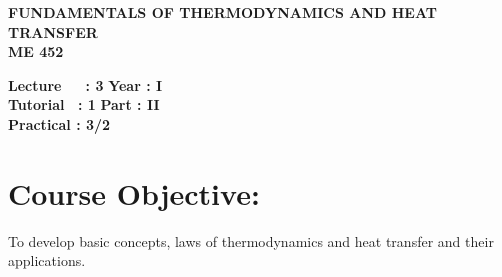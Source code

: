 \begin{center}
    \textbf{\huge{\uppercase{Fundamentals of Thermodynamics and heat transfer}}}
    \\
    \vspace{.5cm}
    \textbf{\large{ME 452}}
\end{center}

\noindent\textbf{Lecture\ \ \ : 3} \hfill \textbf{Year : I } \\
\textbf{Tutorial \ : 1} \hfill \textbf{Part : II } \\
\textbf{Practical : 3/2}  \\

\par
\noindent 
\section*{Course Objective:}
To develop basic concepts, laws of thermodynamics and heat transfer and their applications.


